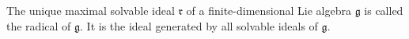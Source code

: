 The unique maximal solvable ideal $\mathfrak{r}$ of a finite-dimensional Lie algebra $\mathfrak{g}$ is called the radical of $\mathfrak{g}$. It is the ideal generated by all solvable ideals of $\mathfrak{g}$.
